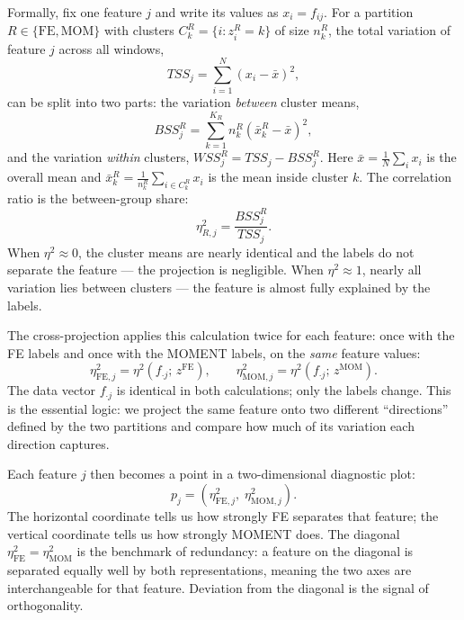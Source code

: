 \documentclass[12pt]{article}
\begin{document}
Formally, fix one feature $j$ and write its values as $x_i = f_{ij}$.
For a partition $R \in \{\text{FE},\text{MOM}\}$ with clusters $C_k^R = \{i : z_i^R = k\}$ of size $n_k^R$, the total variation of feature $j$ across all windows,
\begin{equation}
TSS_j = \sum_{i=1}^{N} (x_i - \bar{x})^2,
\label{eq:tss}
\end{equation}
can be split into two parts: the variation \emph{between} cluster means,
\begin{equation}
BSS_j^R = \sum_{k=1}^{K_R} n_k^R \left(\bar{x}_{k}^{R} - \bar{x}\right)^2,
\label{eq:bss}
\end{equation}
and the variation \emph{within} clusters, $WSS_j^R = TSS_j - BSS_j^R$.
Here $\bar{x} = \frac{1}{N}\sum_i x_i$ is the overall mean and $\bar{x}_k^R = \frac{1}{n_k^R}\sum_{i \in C_k^R} x_i$ is the mean inside cluster $k$.
The correlation ratio is the between-group share:
\begin{equation}
\eta_{R,j}^2
= \frac{BSS_j^R}{TSS_j}.
\label{eq:eta2}
\end{equation}
When $\eta^2 \approx 0$, the cluster means are nearly identical and the labels do not separate the feature --- the projection is negligible.
When $\eta^2 \approx 1$, nearly all variation lies between clusters --- the feature is almost fully explained by the labels.

The cross-projection applies this calculation twice for each feature: once with the FE labels and once with the MOMENT labels, on the \emph{same} feature values:
\begin{equation}
\eta_{\text{FE},j}^2
= \eta^2(f_{\cdot j};\, z^\text{FE}),
\qquad
\eta_{\text{MOM},j}^2
= \eta^2(f_{\cdot j};\, z^\text{MOM}).
\label{eq:eta_two_partitions}
\end{equation}
The data vector $f_{\cdot j}$ is identical in both calculations; only the labels change.
This is the essential logic: we project the same feature onto two different ``directions'' defined by the two partitions and compare how much of its variation each direction captures.

Each feature $j$ then becomes a point in a two-dimensional diagnostic plot:
\begin{equation}
p_j =
\left(
\eta_{\text{FE},j}^2,\;
\eta_{\text{MOM},j}^2
\right).
\label{eq:cross_point}
\end{equation}
The horizontal coordinate tells us how strongly FE separates that feature; the vertical coordinate tells us how strongly MOMENT does.
The diagonal $\eta^2_\text{FE} = \eta^2_\text{MOM}$ is the benchmark of redundancy: a feature on the diagonal is separated equally well by both representations, meaning the two axes are interchangeable for that feature.
Deviation from the diagonal is the signal of orthogonality.
\end{document}
